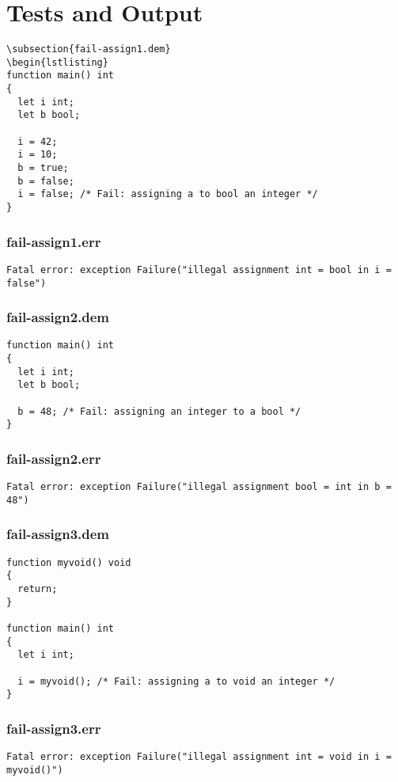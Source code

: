 \chapter{Tests and Output}
\begin{lstlisting}
\subsection{fail-assign1.dem}
\begin{lstlisting}
function main() int
{
  let i int;
  let b bool;

  i = 42;
  i = 10;
  b = true;
  b = false;
  i = false; /* Fail: assigning a to bool an integer */
}
\end{lstlisting}
\subsection{fail-assign1.err}
\begin{lstlisting}
Fatal error: exception Failure("illegal assignment int = bool in i = false")
\end{lstlisting}
\subsection{fail-assign2.dem}
\begin{lstlisting}
function main() int
{
  let i int;
  let b bool;

  b = 48; /* Fail: assigning an integer to a bool */
}
\end{lstlisting}
\subsection{fail-assign2.err}
\begin{lstlisting}
Fatal error: exception Failure("illegal assignment bool = int in b = 48")
\end{lstlisting}
\subsection{fail-assign3.dem}
\begin{lstlisting}
function myvoid() void
{
  return;
}

function main() int
{
  let i int;

  i = myvoid(); /* Fail: assigning a to void an integer */
}
\end{lstlisting}
\subsection{fail-assign3.err}
\begin{lstlisting}
Fatal error: exception Failure("illegal assignment int = void in i = myvoid()")
\end{lstlisting}
